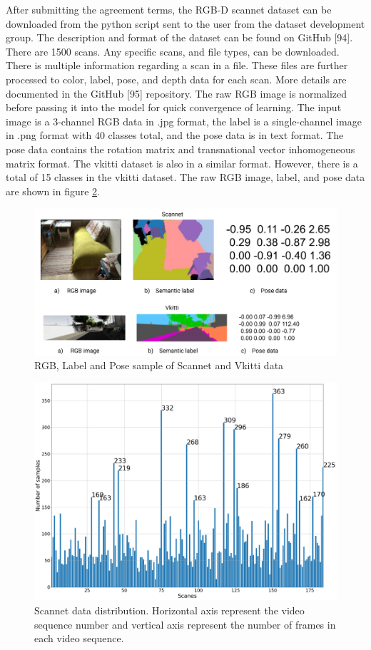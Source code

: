 	After submitting the agreement terms, the RGB-D scannet dataset can be downloaded from the python script sent to the user from the dataset development group. The description and format of the dataset can be found on GitHub [94]. There are 1500 scans. Any specific scans, and file types,  can be downloaded. There is multiple information regarding a scan in a file. These files are further processed to color, label, pose, and depth data for each scan. More details are documented in the GitHub [95] repository. The raw RGB image is normalized before passing it into the model for quick convergence of learning. The input image is a 3-channel RGB data in .jpg format, the label is a single-channel image in .png format with 40 classes total, and the pose data is in text format. The pose data contains the rotation matrix and transnational vector inhomogeneous matrix format. The vkitti dataset is also in a similar format. However, there is a total of 15 classes in the vkitti dataset. The raw RGB image, label, and pose data are shown in figure \ref{fig:scannet_vkitti}. 

	\begin{figure}
		\centering
		\includegraphics[width=14cm]{images/scannet_vkitti_data.png}
		\caption{RGB, Label and Pose sample of Scannet and Vkitti data}
		\label{fig:scannet_vkitti}
	\end{figure}	

	\begin{figure}
		\centering
		\includegraphics[width=14cm]{images/scannet_scanes_samples.png}
		\caption{Scannet data distribution. Horizontal axis represent the video sequence number and vertical axis represent the number of frames in each video sequence.}
		\label{fig:scannet_vkitti}
	\end{figure}

